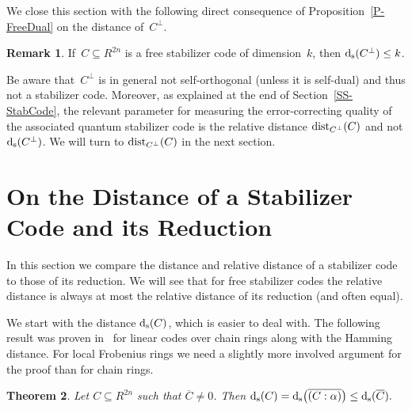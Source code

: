 \documentclass[11pt]{article}
\newtheorem{theo}{Theorem}[section]
\theoremstyle{definition}
\newtheorem{rem}[theo]{Remark}
\numberwithin{equation}{section}
\newcommand{\ds}{\mbox{${\rm d}_{\rm s}$}}
\newcommand{\ov}[1]{\mbox{$\overline{#1}$}}
\newcommand{\dist}{\textup{dist}}
\newcounter{alp}
\newcounter{ara}
\begin{document}
We close this section with the following direct consequence of Proposition~\ref{P-FreeDual} on the distance of~$C^\perp$.

\begin{rem}\label{R-dsCperp}
If~$C\subseteq R^{2n}$ is a free stabilizer code of dimension~$k$, then $\ds(C^\perp)\leq k$.
\end{rem}

Be aware that~$C^\perp$ is in general not self-orthogonal (unless it is self-dual) and thus not a stabilizer code.
Moreover, as explained at the end of Section~\ref{SS-StabCode}, the relevant parameter for measuring the error-correcting quality
of the associated quantum stabilizer code is the relative distance $\dist_{C^\perp}(C)$ and not $\ds(C^\perp)$.
We will turn to $\dist_{C^\perp}(C)$ in the next section.



\section{On the Distance of a Stabilizer Code and its Reduction}\label{SS-Dist}

In this section we compare the distance and relative distance of a stabilizer code to those of its reduction.
We will see that for free stabilizer codes the relative distance is always at most the relative distance of its
reduction (and often equal).

We start with the distance $\ds(C)$, which is easier to deal with.
The following result was proven in~\cite[Thm.~4.2]{NoSa00} for linear codes over chain rings along with the Hamming distance.
For local Frobenius rings we need a slightly more involved argument for the proof than for chain rings.

\begin{theo}\label{T-DistEst}
Let $C \subseteq R^{2n}$ such that $\ov{C}\neq0$. Then $\ds(C) = \ds\big(\ov{(C:\alpha)}\big) \leq \ds(\ov{C}).$
\end{theo}
\end{document}
